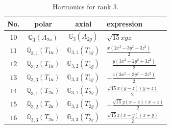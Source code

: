 \documentclass[fleqn,8pt,landscape]{jsarticle}
\begin{document}
\begin{table}[ht!]
\begin{center}
\caption{Harmonics for rank 3.}
\renewcommand{\arraystretch}{1.3}
\begin{tabular}{cccl} \hline \hline
No. & polar & axial & expression \\ \hline
$ 10 $ & $ \mathbb{Q}_{3}(A_{2u}) $ & $ \mathbb{G}_{3}(A_{2g}) $ & $ \sqrt{15} x y z $ \\
$ 11 $ & $ \mathbb{Q}_{3,1}(T_{1u}) $ & $ \mathbb{G}_{3,1}(T_{1g}) $ & $ \frac{x \left(2 x^{2} - 3 y^{2} - 3 z^{2}\right)}{2} $ \\
$ 12 $ & $ \mathbb{Q}_{3,2}(T_{1u}) $ & $ \mathbb{G}_{3,2}(T_{1g}) $ & $ - \frac{y \left(3 x^{2} - 2 y^{2} + 3 z^{2}\right)}{2} $ \\
$ 13 $ & $ \mathbb{Q}_{3,3}(T_{1u}) $ & $ \mathbb{G}_{3,3}(T_{1g}) $ & $ - \frac{z \left(3 x^{2} + 3 y^{2} - 2 z^{2}\right)}{2} $ \\
$ 14 $ & $ \mathbb{Q}_{3,1}(T_{2u}) $ & $ \mathbb{G}_{3,1}(T_{2g}) $ & $ \frac{\sqrt{15} x \left(y - z\right) \left(y + z\right)}{2} $ \\
$ 15 $ & $ \mathbb{Q}_{3,2}(T_{2u}) $ & $ \mathbb{G}_{3,2}(T_{2g}) $ & $ - \frac{\sqrt{15} y \left(x - z\right) \left(x + z\right)}{2} $ \\
$ 16 $ & $ \mathbb{Q}_{3,3}(T_{2u}) $ & $ \mathbb{G}_{3,3}(T_{2g}) $ & $ \frac{\sqrt{15} z \left(x - y\right) \left(x + y\right)}{2} $ \\
 \hline \hline
\end{tabular}
\end{center}
\end{table}
\end{document}
